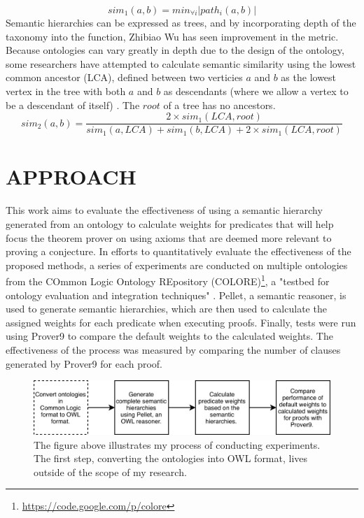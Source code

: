 \documentclass{article}
\begin{document}
\begin{equation}
sim_1(a,b)=min_{\forall i}\lvert{path_i(a,b)}\rvert
\label{rada}
\end{equation}
Semantic hierarchies can be expressed as trees, and by incorporating depth of the taxonomy into the function, Zhibiao Wu has seen improvement in the metric. Because ontologies can vary greatly in depth due to the design of the ontology, some researchers have attempted to calculate semantic similarity using the lowest common ancestor (LCA), defined between two verticies $a$ and $b$ as the lowest vertex in the tree with both $a$ and $b$ as descendants (where we allow a vertex to be a descendant of itself) \cite{wu1994verbs}. The $root$ of a tree has no ancestors. 
\begin{equation}
sim_2(a,b)=\frac{2 \times sim_1(LCA,root)}{sim_1(a,LCA)+sim_1(b,LCA)+2 \times sim_1(LCA,root)}
\label{wu}
\end{equation}

\newpage
\vspace*{.05in}
\section{\MakeUppercase{Approach}}
This work aims to evaluate the effectiveness of using a semantic hierarchy generated from an ontology to calculate weights for predicates that will help focus the theorem prover on using axioms that are deemed more relevant to proving a conjecture. In efforts to quantitatively evaluate the effectiveness of the proposed methods, a series of experiments are conducted on multiple ontologies from the COmmon Logic Ontology REpository (COLORE)\footnote{\url{https://code.google.com/p/colore}}, a "testbed for ontology evaluation and integration techniques" \cite{gruninger2012specifying}. Pellet, a semantic reasoner, is used to generate semantic hierarchies, which are then used to calculate the assigned weights for each predicate when executing proofs. Finally, tests were run using Prover9 to compare the default weights to the calculated weights. The effectiveness of the process was measured by comparing the number of clauses generated by Prover9 for each proof. 

\begin{figure}[h]
\centering
\includegraphics[width=6in]{flowchart}
\caption{The figure above illustrates my process of conducting experiments. The first step, converting the ontologies into OWL format, lives outside of the scope of my research.}
\label{fig:flowchart}
\end{figure}
\end{document}
